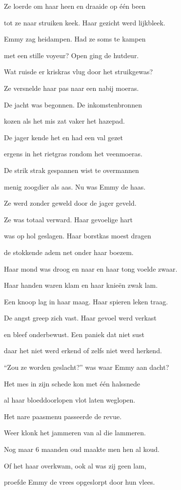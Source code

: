 Ze loerde om haar heen
en draaide op één been

tot ze naar struiken keek.
Haar gezicht werd lijkbleek.

Emmy zag heidampen.
Had ze soms te kampen

met een stille voyeur?
Open ging de hutdeur.

Wat ruisde er kriskras
vlug door het struikgewas?

Ze versnelde haar pas
naar een nabij moeras.

De jacht was begonnen.
De inkomstenbronnen

kozen als het mis zat
vaker het hazepad.

De jager kende het
en had een val gezet

ergens in het rietgras
rondom het veenmoeras.

De strik strak gespannen
wist te overmannen

menig zoogdier als aas.
Nu was Emmy de haas.

Ze werd zonder geweld
door de jager geveld.

Ze was totaal verward.
Haar gevoelige hart

was op hol geslagen.
Haar borstkas moest dragen

de stokkende adem
net onder haar boezem.

Haar mond was droog en naar
en haar tong voelde zwaar.

Haar handen waren klam
en haar knieën zwak lam.

Een knoop lag in haar maag.
Haar spieren leken traag.

De angst greep zich vast.
Haar gevoel werd verkast

en bleef onderbewust.
Een paniek dat niet sust

daar het niet werd erkend
of zelfs niet werd herkend.

“Zou ze worden geslacht?”
was waar Emmy aan dacht?

Het mes in zijn schede
kon met één halssnede

al haar bloeddoorlopen
vlot laten weglopen.

Het nare paasmenu
passeerde de revue.

Weer klonk het jammeren
van al die lammeren.

Nog maar 6 maanden oud
maakte men hen al koud.

Of het haar overkwam,
ook al was zij geen lam,

proefde Emmy de vrees
opgeslorpt door hun vlees.

